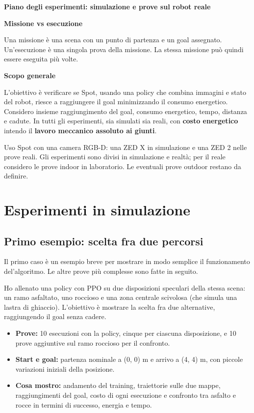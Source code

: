 \documentclass[11pt,a4paper]{article}
\begin{document}
\begin{center}
{\Large\bfseries Piano degli esperimenti: simulazione e prove sul robot reale}
\end{center}

\textbf{Missione vs esecuzione}

Una missione è una scena con un punto di partenza e un goal assegnato. Un'esecuzione è una singola prova della missione. La stessa missione può quindi essere eseguita più volte.

\textbf{Scopo generale}

L'obiettivo è verificare se Spot, usando una policy che combina immagini e stato del robot, riesce a raggiungere il goal minimizzando il consumo energetico. Considero insieme raggiungimento del goal, consumo energetico, tempo, distanza e cadute. In tutti gli esperimenti, sia simulati sia reali, con \textbf{costo energetico} intendo il \textbf{lavoro meccanico assoluto ai giunti}.

Uso Spot con una camera RGB-D: una ZED X in simulazione e una ZED 2 nelle prove reali. Gli esperimenti sono divisi in simulazione e realtà; per il reale considero le prove indoor in laboratorio. Le eventuali prove outdoor restano da definire.

\section{Esperimenti in simulazione}

\subsection{Primo esempio: scelta fra due percorsi}

Il primo caso è un esempio breve per mostrare in modo semplice il funzionamento del'algoritmo.
Le altre prove più complesse sono fatte in seguito.

Ho allenato una policy con PPO su due disposizioni speculari della stessa scena: un ramo asfaltato, uno roccioso e una zona centrale scivolosa (che simula una lastra di ghiaccio).
L'obiettivo è mostrare la scelta fra due alternative, raggiungendo il goal senza cadere.

\begin{itemize}
\item \textbf{Prove:} 10 esecuzioni con la policy, cinque per ciascuna disposizione, e 10 prove aggiuntive sul ramo roccioso per il confronto.
\item \textbf{Start e goal:} partenza nominale a (0, 0) m e arrivo a (4, 4) m, con piccole variazioni iniziali della posizione.
\item \textbf{Cosa mostro:} andamento del training, traiettorie sulle due mappe, raggiungimenti del goal, costo di ogni esecuzione e confronto tra asfalto e rocce in termini di successo, energia e tempo.

\end{itemize}
\end{document}
